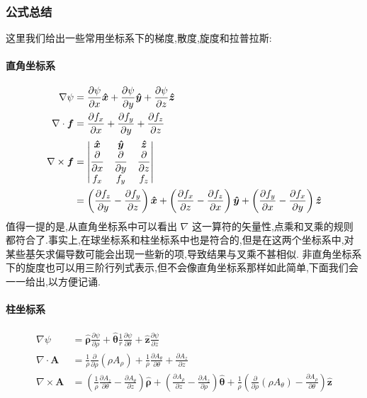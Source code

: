 \documentclass[UTF8]{ctexbook}
\newcommand{\bv}[1]{\boldsymbol{\hat{#1}}}
\newcommand{\pd}[2]{\frac{\partial #1}{\partial #2}}
\newcommand{\downpd}[2]{\frac{\partial}{\partial #2}\left(#1\right)}
\newcommand{\pdn}[1]{\frac{\partial}{\partial #1}}
\begin{document}
\subsubsection{公式总结}

这里我们给出一些常用坐标系下的梯度,散度,旋度和拉普拉斯:

\paragraph{直角坐标系}

\begin{align}
    \nabla \psi &= \pd{\psi}{x}\boldsymbol{\hat{x}} + \pd{\psi}{y}\boldsymbol{\hat{y}} + \pd{\psi}{z}\boldsymbol{\hat{z}} \\
    \nabla \cdot \boldsymbol{f} &= \pd{f_x}{x} + \pd{f_y}{y} + \pd{f_z}{z} \\
    \nabla \times \boldsymbol{f} &=
    \begin{vmatrix}
        \boldsymbol{\hat{x}} & \boldsymbol{\hat{y}} & \boldsymbol{\hat{z}} \\
        \displaystyle \pdn{x} & \displaystyle \pdn{y} & \displaystyle \pdn{z} \\
        f_x & f_y & f_z
    \end{vmatrix} \notag \\
    &= \left(\pd{f_z}{y} - \pd{f_y}{z}\right)\boldsymbol{\hat{x}} + \left(\pd{f_x}{z}-\pd{f_z}{x}\right)\boldsymbol{\hat{y}} + \left(\pd{f_y}{x}-\pd{f_x}{y}\right)\boldsymbol{\hat{z}} 
\end{align}
值得一提的是,从直角坐标系中可以看出 $\nabla$ 这一算符的矢量性,点乘和叉乘的规则都符合了.事实上,在球坐标系和柱坐标系中也是符合的,但是在这两个坐标系中,对某些基矢求偏导数可能会出现一些新的项,导致结果与叉乘不甚相似. 非直角坐标系下的旋度也可以用三阶行列式表示,但不会像直角坐标系那样如此简单,下面我们会一一给出,以方便记诵.

\paragraph{柱坐标系}
\begin{align}
    \nabla \psi &= \boldsymbol{\hat{\rho}} \pd{\psi}{\rho} + \bv{\theta} \frac{1}{r} \pd{\psi}{\theta} + \bv{z} \pd{\psi}{z} \\
    \nabla \cdot \boldsymbol{A} &= \frac{1}{\rho}\downpd{\rho A_\rho}{\rho} + \frac{1}{\rho}\pd{A_\theta}{\theta} + \pd{A_z}{z} \\
    \nabla \times \boldsymbol{A} &= \left(\frac{1}{\rho} \pd{A_z}{\theta} - \pd{A_\theta}{z}\right)\bv{\rho} + \left(\pd{A_\rho}{z} - \pd{A_z}{\rho}\right)\bv{\theta} + \frac{1}{\rho}\left(\downpd{\rho A_\theta}{\rho} - \pd{A_\rho}{\theta}\right)\bv{z}
\end{align}
\end{document}
